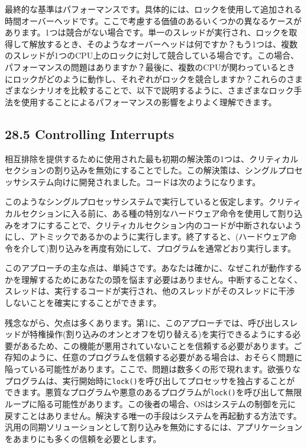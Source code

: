 最終的な基準はパフォーマンスです。具体的には、ロックを使用して追加される時間オーバーヘッドです。ここで考慮する価値のあるいくつかの異なるケースがあります。1つは競合がない場合です。単一のスレッドが実行され、ロックを取得して解放するとき、そのようなオーバーヘッドは何ですか？もう1つは、複数のスレッドが1つのCPU上のロックに対して競合している場合です。この場合、パフォーマンスの問題はありますか？最後に、複数のCPUが関わっているときにロックがどのように動作し、それぞれがロックを競合しますか？これらのさまざまなシナリオを比較することで、以下で説明するように、さまざまなロック手法を使用することによるパフォーマンスの影響をよりよく理解できます。

\hypertarget{controlling-interrupts}{%
\subsection*{28.5 Controlling Interrupts}\label{controlling-interrupts}}

相互排除を提供するために使用された最も初期の解決策の1つは、クリティカルセクションの割り込みを無効にすることでした。この解決策は、シングルプロセッサシステム向けに開発されました。コードは次のようになります。

\begin{Shaded}
\begin{Highlighting}[]
 
\NormalTok{ \}}
 
\NormalTok{ \}}
\end{Highlighting}
\end{Shaded}

このようなシングルプロセッサシステムで実行していると仮定します。クリティカルセクションに入る前に、ある種の特別なハードウェア命令を使用して割り込みをオフにすることで、クリティカルセクション内のコードが中断されないようにし、アトミックであるかのように実行します。終了すると、(ハードウェア命令を介して)割り込みを再度有効にして、プログラムを通常どおり実行します。

このアプローチの主な点は、単純さです。あなたは確かに、なぜこれが動作するかを理解するためにあなたの頭を悩ます必要はありません。中断することなく、スレッドは、実行するコードが実行され、他のスレッドがそのスレッドに干渉しないことを確実にすることができます。

残念ながら、欠点は多くあります。第1に、このアプローチでは、呼び出しスレッドが特権操作(割り込みのオンとオフを切り替える)を実行できるようにする必要があるため、この機能が悪用されていないことを信頼する必要があります。ご存知のように、任意のプログラムを信頼する必要がある場合は、おそらく問題に陥っている可能性があります。ここで、問題は数多くの形で現れます。欲張りなプログラムは、実行開始時に\texttt{lock()}を呼び出してプロセッサを独占することができます。悪質なプログラムや悪意のあるプログラムが\texttt{lock()}を呼び出して無限ループに陥る可能性があります。この後者の場合、OSはシステムの制御を元に戻すことはありません。解決する唯一の手段はシステムを再起動する方法です。汎用の同期ソリューションとして割り込みを無効にするには、アプリケーションをあまりにも多くの信頼を必要とします。

